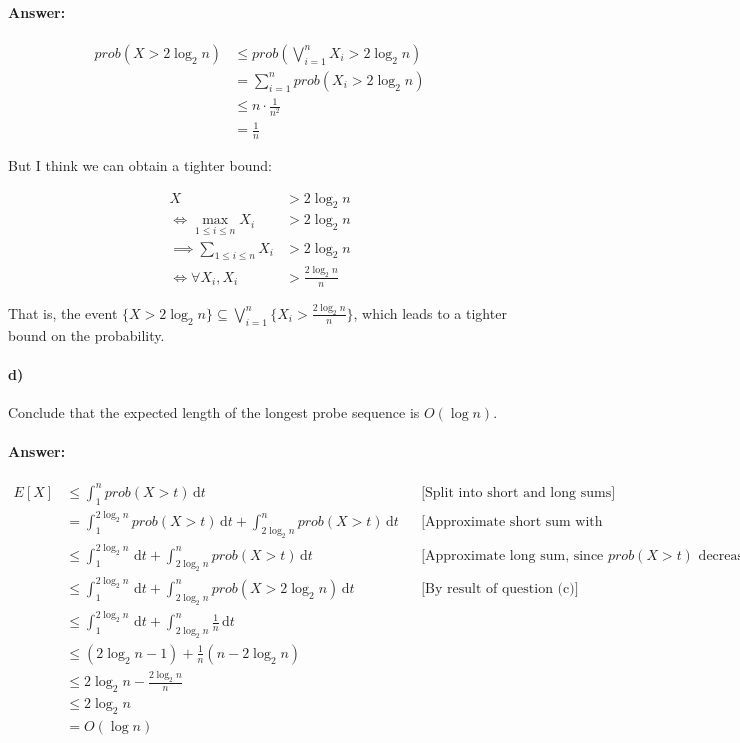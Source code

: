 \documentclass[a4paper]{article}
\begin{document}
\paragraph{Answer:}

\begin{align*}
{prob}(X > 2 \log_2 n) & \le {prob}(\bigvee\limits_{i=1}^n X_i > 2 \log_2 n) \\
& = \sum\limits_{i=1}^n {prob}(X_i > 2 \log_2 n) \\
& \le n \cdot \frac{1}{n^2} \\
& = \frac{1}{n}
\end{align*}

But I think we can obtain a tighter bound:

\begin{align*}
X & > 2 \log_2 n \\
\iff \max\limits_{1 \le i \le n} X_i & > 2 \log_2 n \\
\implies \sum\limits_{1 \le i \le n} X_i & > 2 \log_2 n \\
\iff \forall X_i, X_i & > \frac{2 \log_2 n}{n}
\end{align*}

That is, the event $\{X > 2 \log_2 n\} \subseteq \bigvee\limits_{i=1}^n \{X_i > \frac{2 \log_2 n}{n}\}$, which leads to a tighter bound on the probability.

\paragraph{d)} Conclude that the expected length of the longest probe sequence is $O(\log n)$.

\paragraph{Answer:}

\begin{align*}
E[X] & \le \int_1^n \! {prob}(X > t) \, \mathrm{d}t && \text{[Split into short and long sums]} \\
& = \int_1^{2 \log_2 n} \! {prob}(X > t) \, \mathrm{d}t + \int_{2 \log_2 n}^n \! {prob}(X > t) \, \mathrm{d}t && \text{[Approximate short sum with probability = 1]} \\
& \le \int_1^{2 \log_2 n} \! \, \mathrm{d}t + \int_{2 \log_2 n}^n \! {prob}(X > t) \, \mathrm{d}t && \text{[Approximate long sum, since ${prob}(X > t)$ decreases]} \\
& \le \int_1^{2 \log_2 n} \! \, \mathrm{d}t + \int_{2 \log_2 n}^n \! {prob}(X > 2 \log_2 n) \, \mathrm{d}t && \text{[By result of question (c)]}\\
& \le \int_1^{2 \log_2 n} \! \, \mathrm{d}t + \int_{2 \log_2 n}^n \! \frac{1}{n} \, \mathrm{d}t \\
& \le (2\log_2 n - 1) + \frac{1}{n} (n - 2\log_2 n) \\
& \le 2\log_2 n - \frac{2\log_2 n}{n} \\
& \le 2\log_2 n \\
& = O(\log n)
\end{align*}
\end{document}
